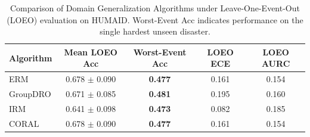 \begin{table}[t]
\centering
\caption{Comparison of Domain Generalization Algorithms under Leave-One-Event-Out (LOEO) evaluation on HUMAID. Worst-Event Acc indicates performance on the single hardest unseen disaster.}
\label{tab:dg_benchmark_humaid}
\begin{tabular}{lcccc}
\toprule
\textbf{Algorithm} & \textbf{Mean LOEO Acc} & \textbf{Worst-Event Acc} & \textbf{LOEO ECE} & \textbf{LOEO AURC} \\
\midrule
ERM & 0.678 $\pm$ 0.090 & \textbf{0.477} & 0.161 & 0.154 \\
GroupDRO & 0.671 $\pm$ 0.085 & \textbf{0.481} & 0.195 & 0.160 \\
IRM & 0.641 $\pm$ 0.098 & \textbf{0.473} & 0.082 & 0.185 \\
CORAL & 0.678 $\pm$ 0.090 & \textbf{0.477} & 0.161 & 0.154 \\
\bottomrule
\end{tabular}
\end{table}
